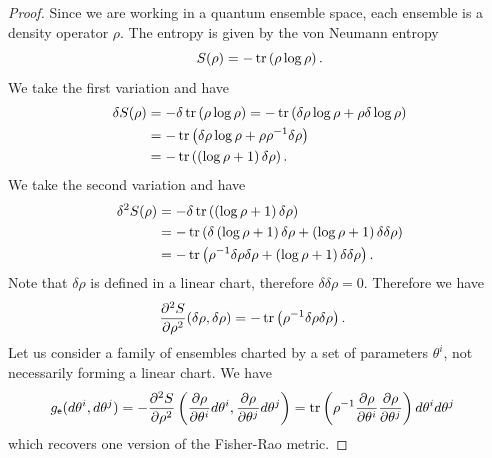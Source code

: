 \begin{mathSection}
\begin{proof}
	Since we are working in a quantum ensemble space, each ensemble is a density operator $\rho$. The entropy is given by the von Neumann entropy
	\begin{equation}
		S(\rho) = - \operatorname{tr}\left(\rho \log \rho\right).
	\end{equation}
	We take the first variation and have
	\begin{equation}
		\begin{aligned}
			\delta S(\rho) &= - \delta \operatorname{tr}\left(\rho \log \rho\right)= - \operatorname{tr}\left(\delta \rho \log \rho + \rho \delta \log \rho\right) \\
			&= - \operatorname{tr}\left(\delta \rho \log \rho + \rho \rho^{-1} \delta \rho \right) \\
			&= - \operatorname{tr}\left(\left(\log \rho + 1 \right) \delta \rho \right).
		\end{aligned}
	\end{equation}
	We take the second variation and have
	\begin{equation}
		\begin{aligned}
			\delta^2 S(\rho) &= - \delta \operatorname{tr}\left(\left(\log \rho + 1 \right) \delta \rho \right) \\
			&= - \operatorname{tr}\left(\delta \left(\log \rho + 1 \right) \delta \rho + \left(\log \rho + 1 \right) \delta \delta \rho \right) \\
			&= - \operatorname{tr}\left(\rho^{-1} \delta \rho \delta \rho + \left(\log \rho + 1 \right) \delta \delta \rho \right).
		\end{aligned}
	\end{equation}
	Note that $\delta \rho$ is defined in a linear chart, therefore $\delta \delta \rho = 0$. Therefore we have 
	\begin{equation}
		\begin{aligned}
			\frac{\partial^2 S}{\partial \rho^2}(\delta \rho, \delta \rho) &= - \operatorname{tr}\left(\rho^{-1} \delta \rho \delta \rho \right).
		\end{aligned}
	\end{equation}
	Let us consider a family of ensembles charted by a set of parameters $\theta^i$, not necessarily forming a linear chart. We have
	\begin{equation}
		\begin{aligned}
			g_{\mathsf{e}}(d\theta^i, d\theta^j) &= - \frac{\partial^2 S}{\partial \rho^2}\left(\frac{\partial 
				\rho}{\partial \theta^i} d\theta^i, \frac{\partial 
				\rho}{\partial \theta^j} d\theta^j\right) = \operatorname{tr}\left( \rho^{-1} \frac{\partial \rho}{\partial \theta^i }\frac{\partial \rho}{\partial \theta^j}\right) d\theta^i d\theta^j
		\end{aligned}
	\end{equation}
	which recovers one version of the Fisher-Rao metric.
	

\end{proof}
\end{mathSection}
